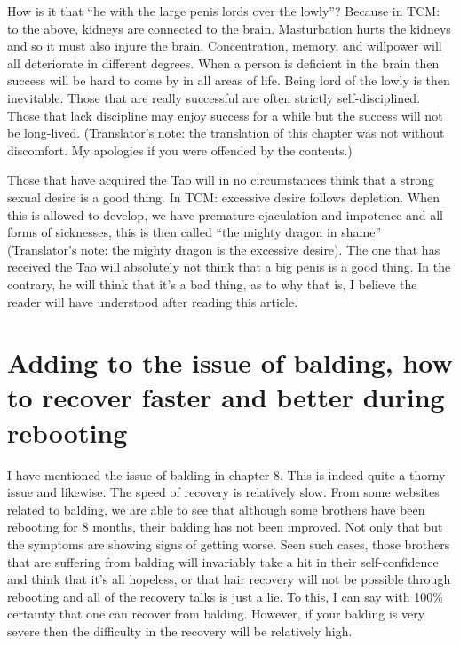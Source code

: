 \documentclass[
]{book}
\begin{document}
How is it that ``he with the large penis lords over the lowly''? Because in TCM: to the above, kidneys are connected to the brain. Masturbation hurts the kidneys and so it must also injure the brain. Concentration, memory, and willpower will all deteriorate in different degrees. When a person is deficient in the brain then success will be hard to come by in all areas of life. Being lord of the lowly is then inevitable. Those that are really successful are often strictly self-disciplined. Those that lack discipline may enjoy success for a while but the success will not be long-lived. (Translator's note: the translation of this chapter was not without discomfort. My apologies if you were offended by the contents.)

Those that have acquired the Tao will in no circumstances think that a strong sexual desire is a good thing. In TCM: excessive desire follows depletion. When this is allowed to develop, we have premature ejaculation and impotence and all forms of sicknesses, this is then called ``the mighty dragon in shame'' (Translator's note: the mighty dragon is the excessive desire). The one that has received the Tao will absolutely not think that a big penis is a good thing. In the contrary, he will think that it's a bad thing, as to why that is, I believe the reader will have understood after reading this article.

\hypertarget{adding-to-the-issue-of-balding-how-to-recover-faster-and-better-during-rebooting}{%
\chapter{Adding to the issue of balding, how to recover faster and better during rebooting}\label{adding-to-the-issue-of-balding-how-to-recover-faster-and-better-during-rebooting}}

I have mentioned the issue of balding in chapter 8. This is indeed quite a thorny issue and likewise. The speed of recovery is relatively slow. From some websites related to balding, we are able to see that although some brothers have been rebooting for 8 months, their balding has not been improved. Not only that but the symptoms are showing signs of getting worse. Seen such cases, those brothers that are suffering from balding will invariably take a hit in their self-confidence and think that it's all hopeless, or that hair recovery will not be possible through rebooting and all of the recovery talks is just a lie. To this, I can say with 100\% certainty that one can recover from balding. However, if your balding is very severe then the difficulty in the recovery will be relatively high.
\end{document}
